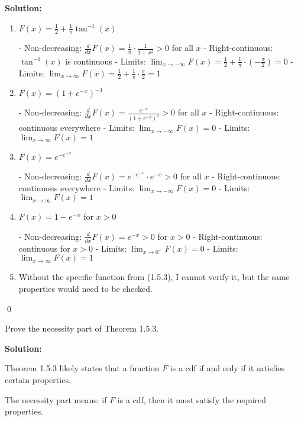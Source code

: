 \noindent\textbf{Solution:}
\begin{enumerate}[label=(\alph*)]
    \item $F(x) = \frac{1}{2} + \frac{1}{\pi}\tan^{-1}(x)$
    
    - Non-decreasing: $\frac{d}{dx}F(x) = \frac{1}{\pi} \cdot \frac{1}{1+x^2} > 0$ for all $x$
    - Right-continuous: $\tan^{-1}(x)$ is continuous
    - Limits: $\lim_{x \to -\infty} F(x) = \frac{1}{2} + \frac{1}{\pi} \cdot (-\frac{\pi}{2}) = 0$
    - Limits: $\lim_{x \to \infty} F(x) = \frac{1}{2} + \frac{1}{\pi} \cdot \frac{\pi}{2} = 1$
    
    \item $F(x) = (1 + e^{-x})^{-1}$
    
    - Non-decreasing: $\frac{d}{dx}F(x) = \frac{e^{-x}}{(1 + e^{-x})^2} > 0$ for all $x$
    - Right-continuous: continuous everywhere
    - Limits: $\lim_{x \to -\infty} F(x) = 0$
    - Limits: $\lim_{x \to \infty} F(x) = 1$
    
    \item $F(x) = e^{-e^{-x}}$
    
    - Non-decreasing: $\frac{d}{dx}F(x) = e^{-e^{-x}} \cdot e^{-x} > 0$ for all $x$
    - Right-continuous: continuous everywhere
    - Limits: $\lim_{x \to -\infty} F(x) = 0$
    - Limits: $\lim_{x \to \infty} F(x) = 1$
    
    \item $F(x) = 1 - e^{-x}$ for $x > 0$
    
    - Non-decreasing: $\frac{d}{dx}F(x) = e^{-x} > 0$ for $x > 0$
    - Right-continuous: continuous for $x > 0$
    - Limits: $\lim_{x \to 0^+} F(x) = 0$
    - Limits: $\lim_{x \to \infty} F(x) = 1$
    
    \item Without the specific function from (1.5.3), I cannot verify it, but the same properties would need to be checked.
\end{enumerate}



\qed
\begin{problembox}
Prove the necessity part of Theorem 1.5.3.
\end{problembox}

\noindent\textbf{Solution:}

Theorem 1.5.3 likely states that a function $F$ is a cdf if and only if it satisfies certain properties.

The necessity part means: if $F$ is a cdf, then it must satisfy the required properties.

